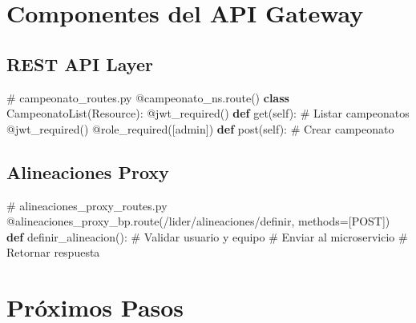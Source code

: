 \documentclass[
  spanish,
  11pt,
  letterpaper,
]{book}
\newenvironment{Shaded}{\begin{snugshade}}{\end{snugshade}}
\newcommand{\AttributeTok}[1]{\textcolor[rgb]{0.40,0.45,0.13}{#1}}
\newcommand{\CommentTok}[1]{\textcolor[rgb]{0.37,0.37,0.37}{#1}}
\newcommand{\KeywordTok}[1]{\textcolor[rgb]{0.00,0.23,0.31}{\textbf{#1}}}
\newcommand{\NormalTok}[1]{\textcolor[rgb]{0.00,0.23,0.31}{#1}}
\newcommand{\OperatorTok}[1]{\textcolor[rgb]{0.37,0.37,0.37}{#1}}
\newcommand{\StringTok}[1]{\textcolor[rgb]{0.13,0.47,0.30}{#1}}
\newcommand{\VariableTok}[1]{\textcolor[rgb]{0.07,0.07,0.07}{#1}}
\begin{document}
\section{Componentes del API Gateway}\label{componentes-del-api-gateway}

\subsection{REST API Layer}\label{rest-api-layer}

\begin{Shaded}
\begin{Highlighting}[]
\CommentTok{\# campeonato\_routes.py}
\AttributeTok{@campeonato\_ns.route}\NormalTok{(}\StringTok{\textquotesingle{}\textquotesingle{}}\NormalTok{)}
\KeywordTok{class}\NormalTok{ CampeonatoList(Resource):}
    \AttributeTok{@jwt\_required}\NormalTok{()}
    \KeywordTok{def}\NormalTok{ get(}\VariableTok{self}\NormalTok{):  }\CommentTok{\# Listar campeonatos}
    \AttributeTok{@jwt\_required}\NormalTok{()}
    \AttributeTok{@role\_required}\NormalTok{([}\StringTok{\textquotesingle{}admin\textquotesingle{}}\NormalTok{])}
    \KeywordTok{def}\NormalTok{ post(}\VariableTok{self}\NormalTok{):  }\CommentTok{\# Crear campeonato}
\end{Highlighting}
\end{Shaded}

\subsection{Alineaciones Proxy}\label{alineaciones-proxy}

\begin{Shaded}
\begin{Highlighting}[]
\CommentTok{\# alineaciones\_proxy\_routes.py}
\AttributeTok{@alineaciones\_proxy\_bp.route}\NormalTok{(}\StringTok{\textquotesingle{}/lider/alineaciones/definir\textquotesingle{}}\NormalTok{, methods}\OperatorTok{=}\NormalTok{[}\StringTok{\textquotesingle{}POST\textquotesingle{}}\NormalTok{])}
\KeywordTok{def}\NormalTok{ definir\_alineacion():}
    \CommentTok{\# Validar usuario y equipo}
    \CommentTok{\# Enviar al microservicio}
    \CommentTok{\# Retornar respuesta}
\end{Highlighting}
\end{Shaded}

\section{Próximos Pasos}\label{pruxf3ximos-pasos-4}
\end{document}
